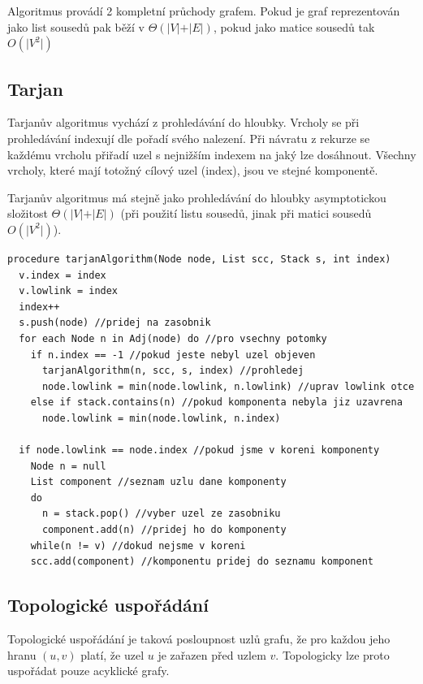 Algoritmus provádí 2 kompletní průchody grafem. Pokud je graf reprezentován jako list sousedů pak běží v $\Theta(\vert V\vert + \vert E \vert)$, pokud jako matice sousedů tak $O(\vert V^2 \vert)$

\subsection{Tarjan}

Tarjanův algoritmus vychází z prohledávání do hloubky. Vrcholy se při prohledávání indexují dle pořadí svého nalezení. Při návratu z rekurze se každému vrcholu přiřadí uzel s nejnižším indexem na jaký lze dosáhnout. Všechny vrcholy, které mají totožný cílový uzel (index), jsou ve stejné komponentě.

Tarjanův algoritmus má stejně jako prohledávání do hloubky asymptotickou složitost $\Theta(\vert V \vert + \vert E \vert)$ (při použití listu sousedů, jinak při matici sousedů $O(\vert V^2 \vert)$).

\lstset{style=java,caption=Tarjan, label=listing:tarjan}
\begin{lstlisting}
procedure tarjanAlgorithm(Node node, List scc, Stack s, int index)
  v.index = index
  v.lowlink = index
  index++
  s.push(node) //pridej na zasobnik
  for each Node n in Adj(node) do //pro vsechny potomky
    if n.index == -1 //pokud jeste nebyl uzel objeven
      tarjanAlgorithm(n, scc, s, index) //prohledej
      node.lowlink = min(node.lowlink, n.lowlink) //uprav lowlink otce
    else if stack.contains(n) //pokud komponenta nebyla jiz uzavrena
      node.lowlink = min(node.lowlink, n.index)

  if node.lowlink == node.index //pokud jsme v koreni komponenty
    Node n = null
    List component //seznam uzlu dane komponenty
    do
      n = stack.pop() //vyber uzel ze zasobniku
      component.add(n) //pridej ho do komponenty
    while(n != v) //dokud nejsme v koreni
    scc.add(component) //komponentu pridej do seznamu komponent
\end{lstlisting}

\vspace{-15px}

\subsection{Topologické uspořádání}
Topologické uspořádání je taková posloupnost uzlů grafu, že pro každou jeho hranu $(u, v)$ platí, že uzel $u$ je zařazen před uzlem $v$. Topologicky lze proto uspořádat pouze acyklické grafy.

